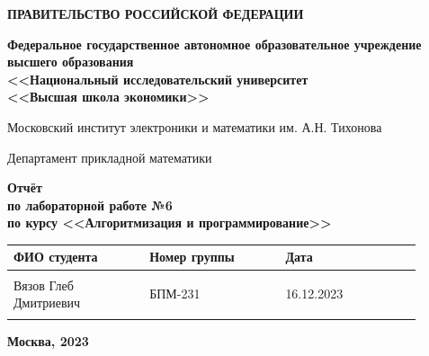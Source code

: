 \documentclass[12pt]{article}
\begin{document}
\thispagestyle{empty}
\begin{center}
\textbf{ПРАВИТЕЛЬСТВО РОССИЙСКОЙ ФЕДЕРАЦИИ}

\vspace{5ex}
	
\textbf{Федеральное государственное автономное образовательное учреждение \\ высшего образования \\ <<Национальный исследовательский университет \\ <<Высшая школа экономики>>}
\end{center}
\vspace{5ex}

\begin{center}
    Московский институт электроники и математики им. А.Н. Тихонова  
    
    \vspace{5ex}
    
    Департамент прикладной математики
    
    \vspace{10ex}
    \textbf{Отчёт \\ по лабораторной работе №6 \\ по курсу <<Алгоритмизация и программирование>>}
	\vspace{7ex}

\end{center}

\begin{center} 
\begin{tabular}{| p{0.3\linewidth}| p{0.3\linewidth}| p{0.3\linewidth}|}
 \hline	
ФИО студента & Номер группы & Дата \\  \hline
 & & \\  
Вязов Глеб \newline Дмитриевич & БПМ-231 & 16.12.2023\\  
 & & \\  \hline		
\end{tabular}
\end{center}

\begin{center}
	\vspace{3ex}
	
	\vfill
   
   \normalsize
    
	\textbf{Москва, 2023}
\end{center}

\newpage

\end{document}
